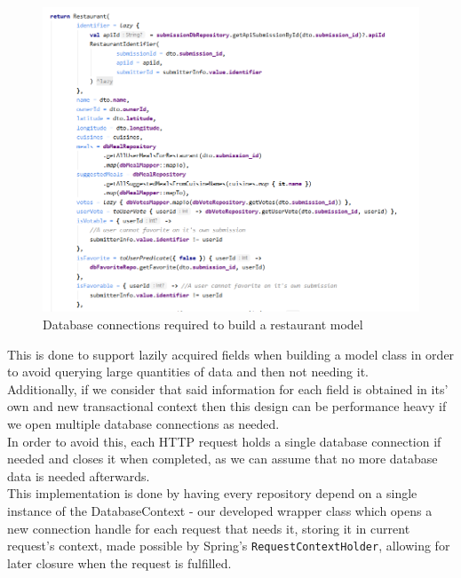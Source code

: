\begin{figure}[H]
    \begin{center}
        \includegraphics[scale=0.8]{_figures/Database_connections_required_to_build_a_restaurant_model.png}
        \caption{Database connections required to build a restaurant model}
    \end{center}
\end{figure}

This is done to support lazily acquired fields when building a model class in order to avoid querying large quantities of data and then not needing it.\\

Additionally, if we consider that said information for each field is obtained in its’ own and new
transactional context then this design can be performance heavy if we open multiple
database connections as needed.\\

In order to avoid this, each HTTP request holds a single database connection if needed
and closes it when completed, as we can assume that no more database data is needed afterwards.\\

This implementation is done by having every repository depend on a single instance of the
DatabaseContext - our developed wrapper class which opens a new connection handle for each
request that needs it, storing it in current request's context, made possible by Spring's 
\texttt{RequestContextHolder}\cite{springRequestContextHolder},
 allowing for later closure when the request is fulfilled.\\ 


